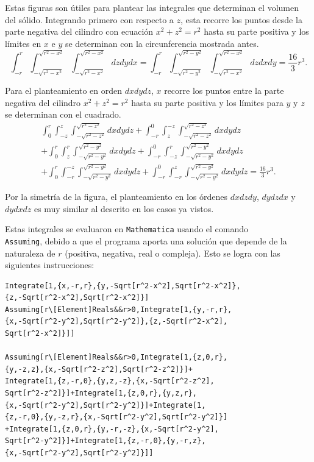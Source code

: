 Estas figuras son útiles para plantear las integrales que determinan el volumen del sólido.
Integrando primero con respecto a $z$, esta recorre los puntos desde la parte negativa del cilindro con ecuación $x^2+z^2=r^2$ hasta su parte positiva y los límites en $x$ e $y$ se determinan con la circunferencia mostrada antes.
%
\[\int_{-r}^{r}\int_{-\sqrt{r^{2}-x^{2}}}^{\sqrt{r^{2}-x^{2}}}\int_{-\sqrt{r^{2}-x^{2}}}^{\sqrt{r^{2}-x^{2}}}dzdydx=\int_{-r}^{r}\int_{-\sqrt{r^{2}-y^{2}}}^{\sqrt{r^{2}-y^{2}}}\int_{-\sqrt{r^{2}-x^{2}}}^{\sqrt{r^{2}-x^{2}}}dzdxdy= \frac{16}{3}r^{3}.\]

Para el planteamiento en  orden $dxdydz$, $x$ recorre los puntos entre la parte negativa del cilindro $x^2+z^2=r^2$ hasta su parte positiva y los límites para $y$ y $z$
se determinan con el cuadrado.
%
\begin{multline*}
\int_{0}^{r}\int_{-z}^{z}\int_{-\sqrt{r^{2}-z^{2}}}^{\sqrt{r^{2}-z^{2}}}dxdydz+\int_{-r}^{0}\int_{z}^{-z}\int_{-\sqrt{r^{2}-z^{2}}}^{\sqrt{r^{2}-z^{2}}}dxdydz \\
+\int_{0}^{r}\int_{z}^{r}\int_{-\sqrt{r^{2}-y^{2}}}^{\sqrt{r^{2}-y^{2}}}dxdydz +\int_{-r}^{0}\int_{-z}^{r}\int_{-\sqrt{r^{2}-y^{2}}}^{\sqrt{r^{2}-y^{2}}}dxdydz\\
+\int_{0}^{r}\int_{-r}^{-z}\int_{-\sqrt{r^{2}-y^{2}}}^{\sqrt{r^{2}-y^{2}}}dxdydz+\int_{-r}^{0}\int_{-r}^{z}\int_{-\sqrt{r^{2}-y^{2}}}^{\sqrt{r^{2}-y^{2}}}dxdydz=\frac{16}{3}r^{3}.
\end{multline*}

Por la simetría de la figura, el planteamiento en los órdenes $dxdzdy$, $dydzdx$ y $dydxdz$ es muy similar al descrito en los casos ya vistos.

Estas integrales se evaluaron en \Verb"Mathematica" usando el comando \\ \Verb"Assuming",
debido a que el programa aporta una solución que depende de la naturaleza de $r$
(positiva, negativa, real o compleja). Esto se logra con las siguientes instrucciones:

\begin{tcolorbox}[title=\bf Instrucción en \verb"Mathematica"]\begin{Verbatim}[formatcom=\letraverbatim]
Integrate[1,{x,-r,r},{y,-Sqrt[r^2-x^2],Sqrt[r^2-x^2]},
{z,-Sqrt[r^2-x^2],Sqrt[r^2-x^2]}]
Assuming[r\[Element]Reals&&r>0,Integrate[1,{y,-r,r},
{x,-Sqrt[r^2-y^2],Sqrt[r^2-y^2]},{z,-Sqrt[r^2-x^2],
Sqrt[r^2-x^2]}]]

Assuming[r\[Element]Reals&&r>0,Integrate[1,{z,0,r},
{y,-z,z},{x,-Sqrt[r^2-z^2],Sqrt[r^2-z^2]}]+
Integrate[1,{z,-r,0},{y,z,-z},{x,-Sqrt[r^2-z^2],
Sqrt[r^2-z^2]}]+Integrate[1,{z,0,r},{y,z,r},
{x,-Sqrt[r^2-y^2],Sqrt[r^2-y^2]}]+Integrate[1,
{z,-r,0},{y,-z,r},{x,-Sqrt[r^2-y^2],Sqrt[r^2-y^2]}]
+Integrate[1,{z,0,r},{y,-r,-z},{x,-Sqrt[r^2-y^2],
Sqrt[r^2-y^2]}]+Integrate[1,{z,-r,0},{y,-r,z},
{x,-Sqrt[r^2-y^2],Sqrt[r^2-y^2]}]]
\end{Verbatim}
\end{tcolorbox}

